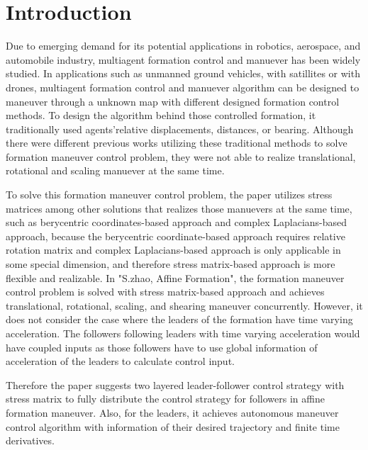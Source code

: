 \section{Introduction}\label{Introduction}

 
 Due to emerging demand for its potential applications in robotics, aerospace, and automobile industry, multiagent formation control and manuever has been widely studied. In applications such as unmanned ground vehicles, with satillites or with drones, multiagent formation control and manuever algorithm can be designed to maneuver through a unknown map with different designed formation control methods. To design the algorithm behind those controlled formation, it traditionally used agents'relative displacements, distances, or bearing. Although there were different previous works utilizing these traditional methods to solve formation maneuver control problem, they were not able to realize translational, rotational and scaling manuever at the same time. 
 
 To solve this formation maneuver control problem, the paper%
  utilizes stress matrices among other solutions that realizes those manuevers at the same time, such as berycentric coordinates-based approach and complex Laplacians-based approach, because the berycentric coordinate-based approach requires relative rotation matrix and complex Laplacians-based approach is only applicable in some special dimension, and therefore stress matrix-based approach is more flexible and realizable. In "S.zhao, Affine Formation", the formation maneuver control problem is solved with stress matrix-based approach and achieves translational, rotational, scaling, and shearing maneuver concurrently. However, it does not consider the case where the leaders of the formation have time varying acceleration. The followers following leaders with time varying acceleration would have coupled inputs as those followers have to use global information of acceleration of the leaders to calculate control input. 
 
 Therefore the paper suggests two layered leader-follower control strategy with stress matrix to fully distribute the control strategy for followers in affine formation maneuver. Also, for the leaders, it achieves autonomous maneuver control algorithm with information of their desired trajectory and finite time derivatives. 

